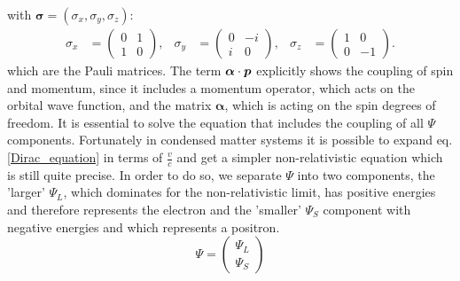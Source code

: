 	with $\boldsymbol{\sigma} = (\sigma_x, \sigma_y, \sigma_z)$:
	\begin{align}
		\sigma_x &=
		 \begin{pmatrix}
		 0 & 1 \\
		 1 & 0
		 \end{pmatrix} ,&
		 \sigma_y &=
		 \begin{pmatrix}
		 0 & -i \\
		 i & 0
		 \end{pmatrix} ,&
		 \sigma_z &=
		 \begin{pmatrix}
		 1 & 0 \\
		 0 & -1
		 \end{pmatrix}.
	\end{align}
	which are the Pauli matrices. The term $\boldsymbol{\alpha} \cdot \boldsymbol{p}$ explicitly shows the coupling of spin and momentum, since it includes a momentum operator, which acts on the orbital wave function, and the matrix $\boldsymbol{\alpha}$, which is acting on the spin degrees of freedom.
%	
	It is essential to solve the equation that includes the coupling of all $\Psi$ components. Fortunately in condensed matter systems it is possible to expand eq.\eqref{Dirac_equation} in terms of $\frac{v}{c}$ and get a simpler non-relativistic equation which is still quite precise.
	In order to do so, we separate $\Psi$ into two components, the 'larger' $\Psi_L$, which dominates for the non-relativistic limit, has positive energies and therefore represents the electron and the 'smaller' $\Psi_S$ component with negative energies and which represents a positron. 
	\begin{equation}
		\Psi = 
		\begin{pmatrix}
			\Psi_L \\ \Psi_S
		\end{pmatrix}
	\end{equation}	
